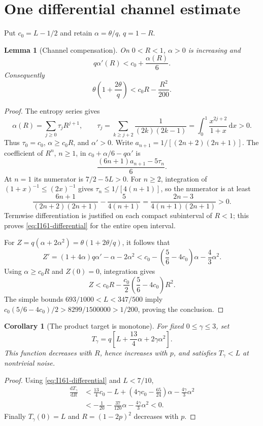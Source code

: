 \documentclass[11pt]{article}
\newtheorem{lemma}[theorem]{Lemma}
\newtheorem{corollary}[theorem]{Corollary}
\theoremstyle{remark}\newtheorem{remark}[theorem]{Remark}
\numberwithin{equation}{section}
\begin{document}
\section{One differential channel estimate}\label{sec:channel}
Put $c_0=L-1/2$ and retain $\alpha=\theta/q$, $q=1-R$.

\begin{lemma}[Channel compensation]\label{lem:I16-channel}
On $0<R<1$, $\alpha>0$ is increasing and
\begin{equation}\label{eq:I161-differential}
 \boxed{q\alpha'(R)<c_0+\frac{\alpha(R)}6.}
\end{equation}
Consequently
\begin{equation}\label{eq:I16-channel}
 \boxed{\theta\left(1+\frac{2\theta}{q}\right)
 <c_0R-\frac{R^2}{200}.}
\end{equation}
\end{lemma}
\begin{proof}
The entropy series gives
\begin{equation}\label{eq:I16-u-series}
 \alpha(R)=\sum_{j\ge0}\tau_jR^{j+1},\qquad
 \tau_j=\sum_{k\ge j+2}\frac1{(2k)(2k-1)}
       =\int_0^1\frac{x^{2j+2}}{1+x}\,\mathrm dx>0.
\end{equation}
Thus $\tau_0=c_0$, $\alpha\ge c_0R$, and $\alpha'>0$.
Write $a_{n+1}=1/[(2n+2)(2n+1)]$. The coefficient of $R^n$, $n\ge1$,
in $c_0+\alpha/6-q\alpha'$ is
\[
 \frac{(6n+1)a_{n+1}-5\tau_n}{6}.
\]
At $n=1$ its numerator is $7/2-5L>0$. For $n\ge2$, integration of
$(1+x)^{-1}\le(2x)^{-1}$ gives $\tau_n\le1/[4(n+1)]$, so the numerator
is at least
\[
 \frac{6n+1}{(2n+2)(2n+1)}-\frac5{4(n+1)}
 =\frac{2n-3}{4(n+1)(2n+1)}>0.
\]
Termwise differentiation is justified on each compact subinterval of $R<1$;
this proves \eqref{eq:I161-differential} for the entire open interval.

For $Z=q(\alpha+2\alpha^2)=\theta(1+2\theta/q)$, it follows that
\[
 Z'=(1+4\alpha)q\alpha'-\alpha-2\alpha^2
 <c_0-\left(\frac56-4c_0\right)\alpha-\frac43\alpha^2.
\]
Using $\alpha\ge c_0R$ and $Z(0)=0$, integration gives
\[
 Z<c_0R-\frac{c_0}{2}\left(\frac56-4c_0\right)R^2.
\]
The simple bounds $693/1000<L<347/500$ imply
$c_0(5/6-4c_0)/2>8299/1500000>1/200$, proving the conclusion.
\end{proof}

\begin{corollary}[The product target is monotone]\label{cor:I161-target}
For fixed $0\le\gamma\le3$, set
\[
 T_\gamma=q\left[L+\frac{13}{4}\alpha+2\gamma\alpha^2\right].
\]
This function decreases with $R$, hence increases with $p$, and satisfies
$T_\gamma<L$ at nontrivial noise.
\end{corollary}
\begin{proof}
Using \eqref{eq:I161-differential} and $L<7/10$,
\begin{align*}
 \frac{\mathrm dT_\gamma}{\mathrm dR}
 &<\frac{13}{4}c_0-L
   +\left(4\gamma c_0-\frac{65}{24}\right)\alpha
   -\frac{4\gamma}{3}\alpha^2\\
 &<-\frac1{20}-\frac{37}{120}\alpha-\frac{4\gamma}{3}\alpha^2<0.
\end{align*}
Finally $T_\gamma(0)=L$ and $R=(1-2p)^2$ decreases with $p$.
\end{proof}
\end{document}
